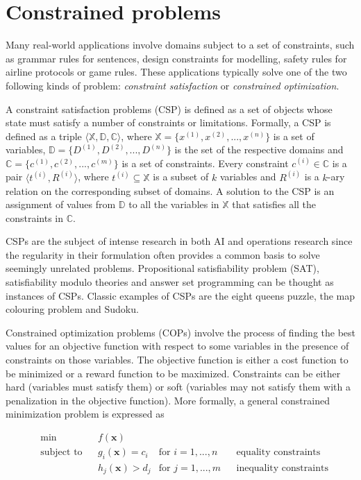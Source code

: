 \section{Constrained problems}

Many real-world applications involve domains subject to a set of constraints, such as grammar rules for sentences, design constraints for modelling, safety rules for airline protocols or game rules. These applications typically solve one of the two following kinds of problem: \textit{constraint satisfaction} or \textit{constrained optimization}.

A constraint satisfaction problems (CSP) is defined as a set of objects whose state must satisfy a number of constraints or limitations.
Formally, a CSP is defined as a triple $\langle \mathbb{X}, \mathbb{D}, \mathbb{C} \rangle$, where $\mathbb{X} = \{x^{(1)}, x^{(2)}, ..., x^{(n)}\}$ is a set of variables, $\mathbb{D} = \{D^{(1)}, D^{(2)}, ..., D^{(n)}\}$ is the set of the respective domains and $\mathbb{C} = \{c^{(1)}, c^{(2)}, ..., c^{(m)}\}$ is a set of constraints. Every constraint $c^{(i)} \in \mathbb{C}$ is a pair $\langle t^{(i)}, R^{(i)} \rangle$, where $t^{(i)} \subseteq \mathbb{X}$ is a subset of $k$ variables and $R^{(i)}$ is a $k$-ary relation on the corresponding subset of domains. A solution to the CSP is an assignment of values from $\mathbb{D}$ to all the variables in $\mathbb{X}$ that satisfies all the constraints in $\mathbb{C}$.

CSPs are the subject of intense research in both AI and operations research since the regularity in their formulation often provides a common basis to solve seemingly unrelated problems. Propositional satisfiability problem (SAT), satisfiability modulo theories and answer set programming can be thought as instances of CSPs. Classic examples of CSPs are the eight queens puzzle, the map colouring problem and Sudoku.

Constrained optimization problems (COPs) involve the process of finding the best values for an objective function with respect to some variables in the presence of constraints on those variables. The objective function is either a cost function to be minimized or a reward function to be maximized. Constraints can be either hard (variables must satisfy them) or soft (variables may not satisfy them with a penalization in the objective function). More formally, a general constrained minimization problem is expressed as

\begin{equation*}
\begin{aligned}
& \text{min} & & f(\bm{x}) & & & \\
& \text{subject to} & & g_i(\bm{x}) = c_i & \text{for $i = 1, ..., n$} & & \text{equality constraints} \\
&&& h_j(\bm{x}) > d_j & \text{for $j = 1, ..., m$} & & \text{inequality constraints}
\end{aligned}
\end{equation*}

